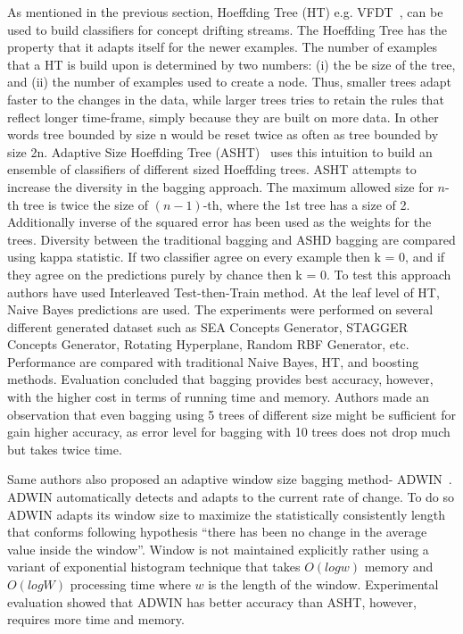 As mentioned in the previous section, Hoeffding Tree (HT) e.g. VFDT~\cite{domingos00:vfdt}, can be used to build classifiers for concept drifting streams. The Hoeffding Tree has the property that it adapts itself for the newer examples. The number of examples that a HT is build upon is determined by two numbers: (i) the be size of the tree, and (ii) the number of examples used to create a node. Thus, smaller trees adapt faster to the changes in the data, while larger trees tries to retain the rules that reflect longer time-frame, simply because they are built on more data. In other words tree bounded by size n would be reset twice as often as tree bounded by size 2n. Adaptive Size Hoeffding Tree (ASHT)~\cite{bifet09:asht} uses this intuition to build an ensemble of classifiers of different sized Hoeffding trees. ASHT attempts to increase the diversity in the bagging approach. The maximum allowed size for $n$-th tree is twice the size of $(n-1)$-th, where the 1st tree has a size of 2. Additionally inverse of the squared error has been used as the weights for the trees. Diversity between the traditional bagging and ASHD bagging are compared using kappa statistic. If two classifier agree on every example then k = 0, and if they agree on the predictions purely by chance then k = 0. To test this approach authors have used Interleaved Test-then-Train method. At the leaf level of HT, Naive Bayes predictions are used. The experiments were performed on several different generated dataset such as SEA Concepts Generator, STAGGER Concepts Generator, Rotating Hyperplane, Random RBF Generator, etc. Performance are compared with traditional Naive Bayes, HT, and boosting methods. Evaluation concluded that bagging provides best accuracy, however, with the higher cost in terms of running time and memory. Authors made an observation that even bagging using 5 trees of different size might be sufficient for gain higher accuracy, as error level for bagging with 10 trees does not drop much but takes twice time.

Same authors also proposed an adaptive window size bagging method- ADWIN~\cite{bifet09:asht}. ADWIN automatically detects and adapts to the current rate of change. To do so ADWIN adapts its window size to maximize the statistically consistently length that conforms following hypothesis ``there has been no change in the average value inside the window''. Window is not maintained explicitly rather using a variant of exponential histogram technique that takes $O(log w)$ memory and $O(log W)$ processing time where $w$ is the length of the window. Experimental evaluation showed that ADWIN has better accuracy than ASHT, however, requires more time and memory. 

